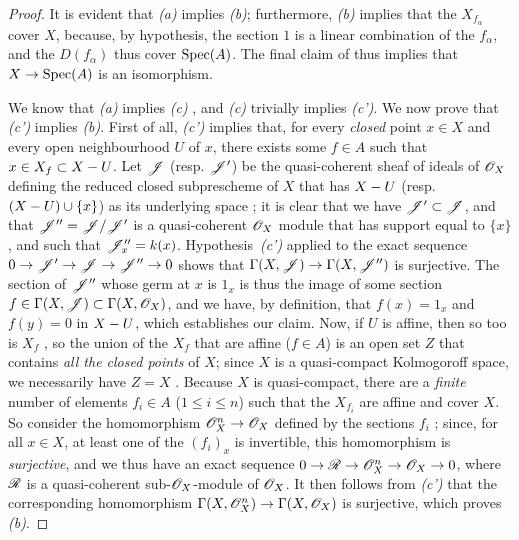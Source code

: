 \begin{proof}
\label{proof-2.5.2.1}
It is evident that \emph{(a)} implies \emph{(b)};
furthermore, \emph{(b)} implies that the $X_{f_\alpha}$ cover $X$, because, by hypothesis, the section $1$ is a linear combination of the $f_\alpha$, and the $D(f_\alpha)$ thus cover ${\mathop{\mathrm{Spec}}\nolimits}(A)$.
The final claim of  thus implies that $X\to\Spec(A)$ is an isomorphism.

We know that \emph{(a)} implies \emph{(c)} , and \emph{(c)} trivially implies \emph{(c')}.
We now prove that \emph{(c')} implies \emph{(b)}.
First of all, \emph{(c')} implies that, for every \emph{closed} point $x\in X$ and every open neighbourhood $U$ of $x$, there exists some $f\in A$ such that $x\in X_f\subset X- U$.
Let $\mathscr{J}$ (resp. $\mathscr{J}'$) be the quasi-coherent sheaf of ideals of $\mathscr{O}_X$ defining the reduced closed subprescheme of $X$ that has $X- U$ (resp. $(X- U)\cup\{x\}$) as its underlying space ;
it is clear that we have $\mathscr{J}'\subset\mathscr{J}$, and that $\mathscr{J}''=\mathscr{J}/\mathscr{J}'$ is a quasi-coherent $\mathscr{O}_X$ module that has support equal to $\{x\}$, and such that $\mathscr{J}_x''=k(x)$.
Hypothesis~\emph{(c')} applied to the exact sequence $0\to\sh{J}'\to\sh{J}\to\sh{J}''\to0$ shows that $\Gamma(X,\sh{J})\to\Gamma(X,\sh{J}'')$ is surjective.
The section of $\mathscr{J}''$ whose germ at $x$ is $1_x$ is thus the image of some section $f\in\Gamma(X,\mathscr{J})\subset\Gamma(X,\mathscr{O}_X)$, and we have, by definition, that $f(x)=1_x$ and $f(y)=0$ in $X- U$, which establishes our claim.
Now, if $U$ is affine, then so too is $X_f$ , so the union of the $X_f$ that are affine ($f\in A$) is an open set $Z$ that contains \emph{all the closed points} of $X$;
since $X$ is a quasi-compact Kolmogoroff space, we necessarily have $Z=X$ .
Because $X$ is quasi-compact, there are a \emph{finite} number of elements $f_i\in A$ ($1\leq i\leq n$) such that the $X_{f_i}$ are affine and cover $X$.
So consider the homomorphism $\OO_X^n\to\OO_X$ defined by the sections $f_i$ ;
since, for all $x\in X$, at least one of the $(f_i)_x$ is invertible, this homomorphism is \emph{surjective}, and we thus have an exact sequence $0\to\sh{R}\to\OO_X^n\to\OO_X\to0$, where $\mathscr{R}$ is a quasi-coherent sub-$\mathscr{O}_X$-module of $\mathscr{O}_X$.
It then follows
from \emph{(c')} that the corresponding homomorphism $\Gamma(X,\OO_X^n)\to\Gamma(X,\OO_X)$ is surjective, which proves \emph{(b)}.


\end{proof}
